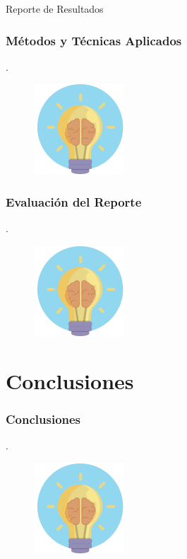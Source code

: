 \documentclass{beamer}
\begin{document}
\begin{frame}
\Huge{\centerline{Reporte de Resultados}}
\end{frame}

\begin{frame}
    \frametitle{Métodos y Técnicas Aplicados}
    .
	\begin{figure}
		\begin{center}
			\includegraphics[scale=0.45]{images/2icons/need.png}
			
		\end{center}
	\end{figure}
\end{frame}

\begin{frame}
    \frametitle{Evaluación del Reporte}
    .
	\begin{figure}
		\begin{center}
			\includegraphics[scale=0.45]{images/2icons/need.png}
			
		\end{center}
	\end{figure}
\end{frame}
\section{Conclusiones} %
\begin{frame}
    \frametitle{Conclusiones}
    .
	\begin{figure}
		\begin{center}
			\includegraphics[scale=0.45]{images/2icons/need.png}
			
		\end{center}
	\end{figure}
\end{frame}
\end{document}
